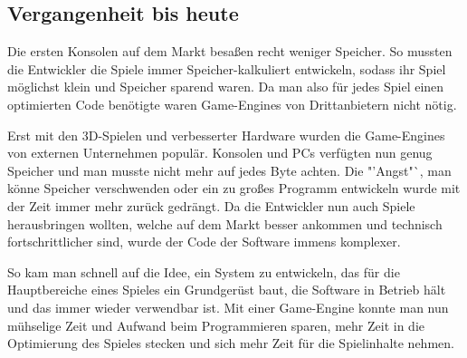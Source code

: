 \subsection{Vergangenheit bis heute}
\label{vergangenheit}
Die ersten Konsolen auf dem Markt besaßen recht weniger Speicher. So mussten die Entwickler die Spiele immer Speicher-kalkuliert entwickeln, sodass ihr Spiel möglichst klein und Speicher sparend waren. Da man also für jedes Spiel einen optimierten Code benötigte waren Game-Engines von Drittanbietern nicht nötig.

Erst mit den 3D-Spielen und verbesserter Hardware wurden die Game-Engines von externen Unternehmen populär. Konsolen und PCs verfügten nun genug Speicher und man musste nicht mehr auf jedes Byte achten. Die "'Angst"`, man könne Speicher verschwenden oder ein zu großes Programm entwickeln wurde mit der Zeit immer mehr zurück gedrängt.
Da die Entwickler nun auch Spiele herausbringen wollten, welche auf dem Markt besser ankommen und technisch fortschrittlicher sind, wurde der Code der Software immens komplexer.

So kam man schnell auf die Idee, ein System zu entwickeln, das für die Hauptbereiche eines Spieles ein Grundgerüst baut, die Software in Betrieb hält und das immer wieder verwendbar ist. Mit einer Game-Engine konnte man nun mühselige Zeit und Aufwand beim Programmieren sparen, mehr Zeit in die Optimierung des Spieles stecken und sich mehr Zeit für die Spielinhalte nehmen. 